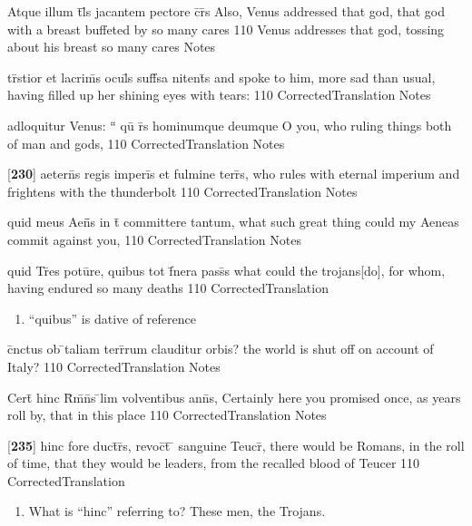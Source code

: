 \documentclass[]{book}
\begin{document}
\latline
  {Atque illum t\={}l\={\macron {\i}}s jacantem pectore c\={}r\={}s}
  { Also, Venus addressed that god, that god with a breast buffeted by so many cares }
  {110}
  { Venus addresses that god, tossing about his breast so many cares }
  { Notes }


\latline
  {tr\={\macron {\i}}stior et lacrim\={\macron {\i}}s ocul\={}s suff\={}sa nitent\={\macron {\i}}s}
  { and spoke to him, more sad than usual, having filled up her shining eyes with tears: }
  {110}
  { CorrectedTranslation }
  { Notes }


\latline
  {adloquitur Venus: ``\={} qu\={\macron {\i}} r\={}s hominumque deumque}
  { O you, who ruling things both of man and gods, }
  {110}
  { CorrectedTranslation }
  { Notes }


\latline
  {[\textbf{230}] aetern\={\macron {\i}}s regis imperi\={\macron {\i}}s et fulmine terr\={}s,}
  { who rules with eternal imperium and frightens with the thunderbolt }
  {110}
  { CorrectedTranslation }
  { Notes }


\latline
  {quid meus Aen\={}\={}s in t\={} committere tantum,}
  { what such great thing could my Aeneas commit against you, }
  {110}
  { CorrectedTranslation }
  { Notes }


\latline
  {quid Tr\={}es potu\={}re, quibus tot f\={}nera pass\={\macron {\i}}s}
  { what could the trojans[do], for whom, having endured so many deaths}
  {110}
  { CorrectedTranslation }
  { \begin{enumerate}
  	\item ``quibus'' is dative of reference
  \end{enumerate} }


\latline
  {c\={}nctus ob \={}taliam terr\={}rum clauditur orbis?}
  { the world is shut off on account of Italy? }
  {110}
  { CorrectedTranslation }
  { Notes }


\latline
  {Cert\={} hinc R\={}m\={}n\={}s \={}lim volventibus ann\={\macron {\i}}s,}
  { Certainly here you promised once, as years roll by, that in this place }
  {110}
  { CorrectedTranslation }
  { Notes }


\latline
  {[\textbf{235}] hinc fore duct\={}r\={}s, revoc\={}t\={} \={} sanguine Teucr\={\macron {\i}},}
  { there would be Romans, in the roll of time, that they would be leaders, from the recalled blood of Teucer }
  {110}
  { CorrectedTranslation }
  { \begin{enumerate}
  	\item What is ``hinc'' referring to?  These men, the Trojans.
  \end{enumerate} }
\end{document}
